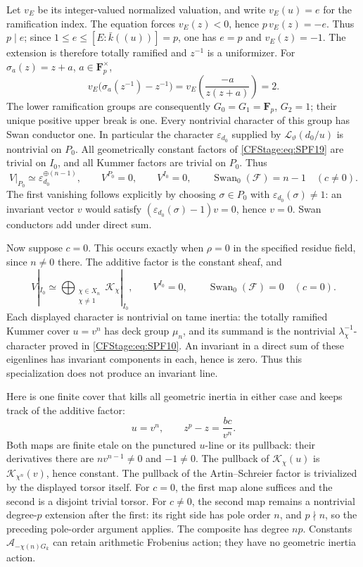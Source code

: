Let \(v_E\) be its integer-valued normalized valuation, and
write \(v_E(u)=e\) for the ramification index. The equation
forces \(v_E(z)<0\), hence \(p\,v_E(z)=-e\).
Thus \(p\mid e\); since \(1\le e\le [E:\bar k((u))]=p\),
one has \(e=p\) and \(v_E(z)=-1\). The extension is
therefore totally ramified and \(z^{-1}\) is a uniformizer.
For \(\sigma_a(z)=z+a\), \(a\in\mathbf F_p^\times\),
\[
 v_E\bigl(\sigma_a(z^{-1})-z^{-1}\bigr)
  =v_E\left(\frac{-a}{z(z+a)}\right)=2.
 \tag{SPF.23}\label{CFStage:eq:SPF23}
\]
The lower ramification groups are consequently
\(G_0=G_1=\mathbf F_p\), \(G_2=1\); their unique positive
upper break is one. Every nontrivial character of this group
has Swan conductor one. In particular the character
\(\varepsilon_{d_0}\) supplied by
\(\mathcal L_\vartheta(d_0/u)\) is nontrivial on \(P_0\).
All geometrically constant factors of
\eqref{CFStage:eq:SPF19} are trivial on \(I_0\), and all Kummer
factors are trivial on \(P_0\). Thus
\[
 V|_{P_0}\simeq \varepsilon_{d_0}^{\oplus(n-1)},\qquad
 V^{P_0}=0,\qquad V^{I_0}=0,\qquad
 \operatorname{Swan}_0(\mathcal F)=n-1
                   \quad(c\ne0).
 \tag{SPF.24}\label{CFStage:eq:SPF24}
\]
The first vanishing follows explicitly by choosing
\(\sigma\in P_0\) with \(\varepsilon_{d_0}(\sigma)\ne1\):
an invariant vector \(v\) would satisfy
\((\varepsilon_{d_0}(\sigma)-1)v=0\), hence \(v=0\).
Swan conductors add under direct sum.

Now suppose \(c=0\). This occurs exactly when \(\rho=0\)
in the specified residue field, since \(n\ne0\) there.
The additive factor is the constant sheaf, and
\[
 V|_{I_0}\simeq
    \bigoplus_{\substack{\chi\in X_n\\\chi\ne1}}
            \mathcal K_\chi|_{I_0},\qquad
 V^{I_0}=0,\qquad
 \operatorname{Swan}_0(\mathcal F)=0
                      \quad(c=0).
 \tag{SPF.25}\label{CFStage:eq:SPF25}
\]
Each displayed character is nontrivial on tame inertia:
the totally ramified Kummer cover \(u=v^n\) has deck group
\(\mu_n\), and its summand is the nontrivial
\(\lambda_\chi^{-1}\)-character proved in
\eqref{CFStage:eq:SPF10}. An invariant in a direct sum of these
eigenlines has invariant components in each, hence is zero.
Thus this specialization does not produce an invariant line.

Here is one finite cover that kills all geometric inertia in
either case and keeps track of the additive factor:
\[
 u=v^n,\qquad z^p-z=\frac{bc}{v^n}.
 \tag{SPF.26}\label{CFStage:eq:SPF26}
\]
Both maps are finite etale on the punctured \(u\)-line or its
pullback: their derivatives there are \(nv^{n-1}\ne0\) and
\(-1\ne0\). The pullback of \(\mathcal K_\chi(u)\) is
\(\mathcal K_{\chi^n}(v)\), hence constant. The pullback of
the Artin--Schreier factor is trivialized by the displayed
torsor itself. For \(c=0\), the first map alone suffices and
the second is a disjoint trivial torsor. For \(c\ne0\), the
second map remains a nontrivial degree-\(p\) extension
after the first: its right side has pole order \(n\), and
\(p\nmid n\), so the preceding pole-order argument applies.
The composite has degree \(np\). Constants
\(\mathcal A_{-\chi(n)G_k}\) can retain arithmetic
Frobenius action; they have no geometric inertia action.

